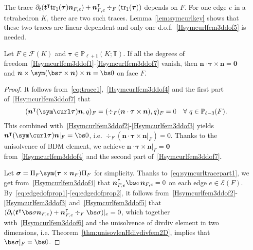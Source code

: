 The trace $\partial_{t}(\boldsymbol  t^{\intercal}{\rm tr}_1(\boldsymbol \tau)\boldsymbol  n_{F,e}) +\boldsymbol  n_{F,e}^{\intercal}\div_F({\rm tr}_1(\boldsymbol \tau))$ depends on $F$. For one edge $e$ in a tetrahedron $K$, there are two such traces. Lemma~\ref{lem:symcurlkey} shows that these two traces are linear dependent and only one d.o.f.~\eqref{Hsymcurlfem3ddof5} is needed. 

\begin{lemma}\label{lem:trace0}
Let $F\in\mathcal F(K)$ and $\boldsymbol \tau\in\mathbb P_{\ell+1}(K;\mathbb T)$.
If all the degrees of freedom~\eqref{Hsymcurlfem3ddof1}-\eqref{Hsymcurlfem3ddof7} vanish, then $\boldsymbol n\cdot \boldsymbol\tau\times\boldsymbol n =\boldsymbol 0$ and $\boldsymbol n\times\sym(\bs\tau\times\boldsymbol n)\times\boldsymbol n =\bs0$ on face $F$.
\end{lemma}
\begin{proof}
It follows from~\eqref{eq:trace1},~\eqref{Hsymcurlfem3ddof4} and the first part of~\eqref{Hsymcurlfem3ddof7} that
\[
(\boldsymbol  n^{\intercal}(\sym\curl\boldsymbol\tau)\boldsymbol  n, q)_F=(\div_F(\boldsymbol n\cdot \boldsymbol \tau\times\boldsymbol n), q)_F=0\quad\forall~q\in\mathbb P_{\ell-3}(F).
\]
This combined with~\eqref{Hsymcurlfem3ddof2}-\eqref{Hsymcurlfem3ddof3} yields $\boldsymbol n^{\intercal}(\sym\curl\boldsymbol\tau)\boldsymbol n|_F=\bs0$, i.e. $\div_F(\boldsymbol n\cdot \boldsymbol \tau\times\boldsymbol n|_F)=0$.
Thanks to the unisolvence of BDM element, we achieve $\boldsymbol n\cdot\boldsymbol\tau\times\boldsymbol n |_F=\boldsymbol 0$ from~\eqref{Hsymcurlfem3ddof4} and the second part of~\eqref{Hsymcurlfem3ddof7}.

Let $\boldsymbol \sigma=\Pi_F\sym(\boldsymbol\tau\times\boldsymbol n_F)\Pi_F$ for simplicity. 
Thanks to~\eqref{eq:symcurltracepart1}, we get from~\eqref{Hsymcurlfem3ddof4} that $\boldsymbol n_{F,e}^{\intercal}\bs\sigma\boldsymbol n_{F,e}=0$ on each edge $e\in\mathcal E(F)$.
By~\eqref{eq:edgedofprop1}-\eqref{eq:edgedofprop2}, it follows from~\eqref{Hsymcurlfem3ddof2}-\eqref{Hsymcurlfem3ddof3} and~\eqref{Hsymcurlfem3ddof5} that
$(\partial_{t}(\boldsymbol  t^{\intercal} \bs\sigma\boldsymbol n_{F,e}) +\boldsymbol  n_{F,e}^{\intercal}\div_F\bs\sigma)|_e=0$, which together with~\eqref{Hsymcurlfem3ddof6} and 
the unisolvence of divdiv element in two dimensions, 
i.e. Theorem~\ref{thm:unisovlenHdivdivfem2D},
implies that $\bs\sigma|_F=\bs0$.
\end{proof}


